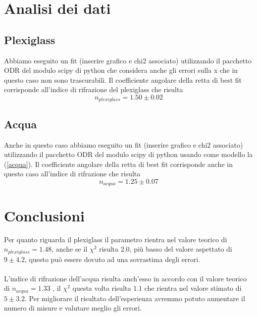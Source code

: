 \documentclass{article}
\begin{document}
	\section{Analisi dei dati}
		\subsection{Plexiglass}
			Abbiamo eseguito un fit (inserire grafico e chi2 associato) utilizzando il pacchetto ODR del modulo scipy di python che considera anche gli errori sulla x che in questo caso non sono trascurabili. Il coefficiente angolare della retta di best fit corrisponde all'indice di rifrazione del plexiglass che risulta
			\begin{equation*}
			n_{plexiglass} = 1.50 \pm 0.02
			\end{equation*}
			
		\subsection{Acqua}
			Anche in questo caso abbiamo eseguito un fit (inserire grafico e chi2 associato) utilizzando il pacchetto ODR del modulo scipy di python usando come modello la (\ref{acqua}). Il coefficiente angolare della retta di best fit corrisponde anche in questo caso all'indice di rifrazione che risulta 
			\begin{equation*}
				n_{acqua} = 1.25 \pm 0.07
			\end{equation*}
				
	\section{Conclusioni}	
		Per quanto riguarda il plexiglass il parametro rientra nel valore teorico di $n_{plexiglass} = 1.48$, anche se il $\chi^2$ risulta $2.0$, pi\`{u} basso del valore aspettato di $9\pm4.2$, questo pu\`{o} essere dovuto ad una sovrastima degli errori.\\\\
		L'indice di rifrazione dell'acqua risulta anch'esso in accordo con il valore teorico di $n_{acqua}=1.33$ , il $\chi^2$ questa volta risulta $1.1$ che rientra nel valore stimato di $5\pm 3.2$. Per migliorare il risultato dell'esperienza avremmo potuto aumentare il numero di misure e valutare meglio gli errori.
	
\end{document}
